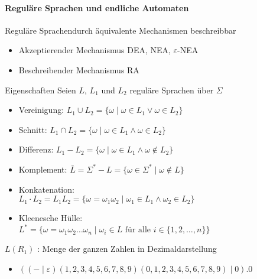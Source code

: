\graphicspath{{images/}}

\paragraph{Reguläre Sprachen und endliche Automaten}

\begin{concept}{Reguläre Sprachen}durch äquivalente Mechanismen beschreibbar
    \begin{itemize}
        \item Akzeptierender Mechanismus
         DEA, NEA, $\varepsilon$-NEA
        \item Beschreibender Mechanismus RA
    \end{itemize}
\end{concept}

\begin{theorem}{Eigenschaften}
    Seien $L$, $L_{1}$ und $L_{2}$ reguläre Sprachen über $\Sigma$
    \begin{itemize}
        \item Vereinigung: $L_{1} \cup L_{2}=\{\omega \mid \omega \in L_{1} \vee \omega \in L_{2}\}$
        \item Schnitt: $L_{1} \cap L_{2}=\{\omega \mid \omega \in L_{1} \wedge \omega \in L_{2}\}$
        \item Differenz: $L_{1}-L_{2}=\{\omega \mid \omega \in L_{1} \wedge \omega \notin L_{2}\}$
        \item Komplement: $\bar{L}=\Sigma^{*}-L=\{\omega \in \Sigma^{*} \mid \omega \notin L\}$
        \item Konkatenation:\\
        $L_{1} \cdot L_{2}= L_{1} L_{2} = \{\omega=\omega_{1} \omega_{2} \mid \omega_{1} \in L_{1} \wedge \omega_{2} \in L_{2}\}$
        \item Kleenesche Hülle:\\
        $L^{*}=\{\omega=\omega_{1} \omega_{2} \ldots \omega_{n} \mid \omega_{i} \in L \text { für alle } i \in\{1,2, \ldots, n\}\}$
    \end{itemize}
\end{theorem}

\begin{remark}
    $L\left(R_{1}\right)$ : Menge der ganzen Zahlen in Dezimaldarstellung
    \begin{itemize}
    \item $((-\mid \varepsilon)(1,2,3,4,5,6,7,8,9)(0,1,2,3,4,5,6,7,8,9) \mid 0) .0$
    \end{itemize}
\end{remark}

